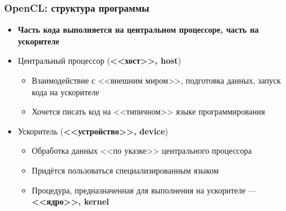 \documentclass[xcolor=table,aspectratio=169]{beamer}
\begin{document}
\begin{frame}[fragile]
  \frametitle{OpenCL: структура программы}
  \begin{minipage}[t]{0.7\textwidth}
  \begin{itemize}
    \item \textbf{Часть кода выполняется на центральном процессоре, часть на ускорителе}
    \item Центральный процессор (\textbf{<<хост>>, host})
    \begin{itemize}
      \item Взаимодействие с <<внешним миром>>, подготовка данных, запуск кода на ускорителе
      \item Хочется писать код на <<типичном>> языке программирования
    \end{itemize} 
    \item Ускоритель (\textbf{<<устройство>>, device})
    \begin{itemize}
      \item Обработка данных <<по указке>> центрального процессора
      \item Придётся пользоваться специализированным языком
      \item Процедура, предназначенная для выполнения на ускорителе --- \textbf{<<ядро>>, kernel}\footnotemark
    \end{itemize} 
  \end{itemize}
\end{minipage}
\begin{minipage}[t]{0.28\textwidth}

\end{minipage}
\end{frame}
\end{document}
